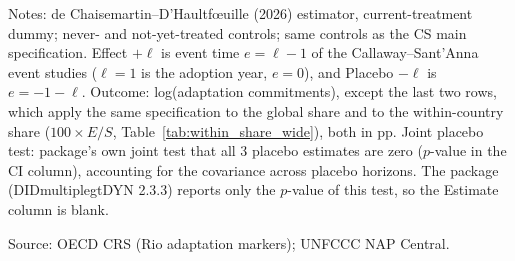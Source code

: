 \begin{table}[H]
\centering
\caption{Robustness: de Chaisemartin and D'Haultf{\oe}uille (2026) estimator}
\label{tab:dcdh}
\begingroup\small
{}
\endgroup
\par\vspace{4pt}
\begin{minipage}{\linewidth}\footnotesize
Notes: de Chaisemartin--D'Haultf{\oe}uille (2026) estimator, current-treatment dummy; never- and not-yet-treated controls; same controls as the CS main specification. Effect $+\ell$ is event time $e = \ell - 1$ of the Callaway--Sant'Anna event studies ($\ell = 1$ is the adoption year, $e = 0$), and Placebo $-\ell$ is $e = -1 - \ell$. Outcome: log(adaptation commitments), except the last two rows, which apply the same specification to the global share and to the within-country share ($100 \times E/S$, Table~\ref{tab:within_share_wide}), both in pp. Joint placebo test: package's own joint test that all 3 placebo estimates are zero ($p$-value in the CI column), accounting for the covariance across placebo horizons. The package (DIDmultiplegtDYN 2.3.3) reports only the $p$-value of this test, so the Estimate column is blank.\par
Source: OECD CRS (Rio adaptation markers); UNFCCC NAP Central.
\end{minipage}
\end{table}
